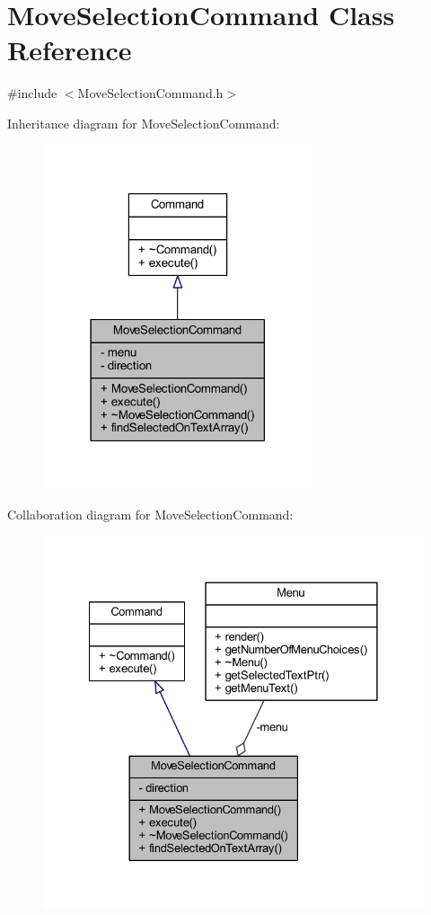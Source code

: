 \hypertarget{class_move_selection_command}{}\section{Move\+Selection\+Command Class Reference}
\label{class_move_selection_command}


{\ttfamily \#include $<$Move\+Selection\+Command.\+h$>$}



Inheritance diagram for Move\+Selection\+Command\+:
\nopagebreak
\begin{figure}[H]
\begin{center}
\leavevmode
\includegraphics[width=225pt]{class_move_selection_command__inherit__graph}
\end{center}
\end{figure}


Collaboration diagram for Move\+Selection\+Command\+:
\nopagebreak
\begin{figure}[H]
\begin{center}
\leavevmode
\includegraphics[width=328pt]{class_move_selection_command__coll__graph}
\end{center}
\end{figure}
